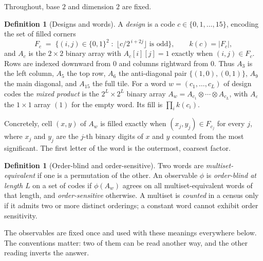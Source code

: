 \documentclass[11pt]{amsart}
\theoremstyle{definition}
\newtheorem{definition}[theorem]{Definition}
\theoremstyle{remark}
\begin{document}
Throughout, base $2$ and dimension $2$ are fixed.

\begin{definition}[Designs and words]
\label{def:design}
A \emph{design} is a code $c \in \{0,1,\dots,15\}$, encoding the set of filled corners
\[
  F_c \;=\; \bigl\{(i,j) \in \{0,1\}^2 \;:\; \lfloor c/2^{\,i+2j} \rfloor \text{ is odd}\bigr\},
  \qquad k(c) = |F_c|,
\]
and $A_c$ is the $2 \times 2$ binary array with $A_c[i][j] = 1$ exactly when $(i,j) \in F_c$. Rows are indexed downward from $0$ and columns rightward from $0$. Thus $A_3$ is the left column, $A_5$ the top row, $A_6$ the anti-diagonal pair $\{(1,0),(0,1)\}$, $A_9$ the main diagonal, and $A_{15}$ the full tile. For a word $w = (c_1,\dots,c_L)$ of design codes the \emph{mixed product} is the $2^L \times 2^L$ binary array $A_w = A_{c_1} \otimes \cdots \otimes A_{c_L}$, with $A_{\varepsilon}$ the $1 \times 1$ array $(1)$ for the empty word. Its fill is $\prod_i k(c_i)$.
\end{definition}

Concretely, cell $(x,y)$ of $A_w$ is filled exactly when $(x_j, y_j) \in F_{c_j}$ for every $j$, where $x_j$ and $y_j$ are the $j$-th binary digits of $x$ and $y$ counted from the most significant. The first letter of the word is the outermost, coarsest factor.

\begin{definition}[Order-blind and order-sensitive]
\label{def:blind}
Two words are \emph{multiset-equivalent} if one is a permutation of the other. An observable $\phi$ is \emph{order-blind at length $L$} on a set of codes if $\phi(A_w)$ agrees on all multiset-equivalent words of that length, and \emph{order-sensitive} otherwise. A multiset is \emph{counted} in a census only if it admits two or more distinct orderings; a constant word cannot exhibit order sensitivity.
\end{definition}

The observables are fixed once and used with these meanings everywhere below. The conventions matter: two of them can be read another way, and the other reading inverts the answer.
\end{document}
